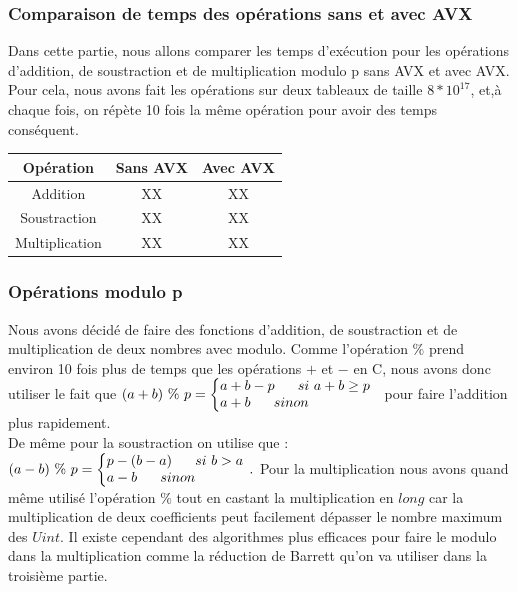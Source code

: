 \documentclass[12pt, a4paper]{article}
\begin{document}
\subsubsection{Comparaison de temps des opérations sans et avec AVX}

Dans cette partie, nous allons comparer les temps d'exécution pour les opérations d'addition, de soustraction et de multiplication modulo p sans AVX et avec AVX. Pour cela, nous avons fait les opérations sur deux tableaux de taille $8*10^{17}$, et,à chaque fois, on répète 10 fois la même opération pour avoir des temps conséquent.

\begin{center}
\begin{tabular}{||c c c||}
\hline
Opération & Sans AVX & Avec AVX \\
\hline\hline
Addition & XX & XX \\
\hline
Soustraction & XX & XX \\
\hline
Multiplication & XX & XX \\
\hline
\end{tabular}
\end{center}

\subsubsection{Opérations modulo p}

Nous avons décidé de faire des fonctions d'addition, de soustraction et de multiplication de deux nombres avec modulo. Comme l'opération $\%$ prend environ 10 fois plus de temps que les opérations $+$ et $-$ en C, nous avons donc utiliser le fait que 
$ (a+b)\ \%\ p = 
\left\{\begin{array}{@{}l@{}}
a + b - p\ \ \ \ \ si\ a+b \geq p\\
a + b\ \ \ \ \ sinon
\end{array}\right.\,\ $ pour faire l'addition plus rapidement. \\
De même pour la soustraction on utilise que :
$ (a-b)\ \%\ p = 
\left\{\begin{array}{@{}l@{}}
p - (b - a)\ \ \ \ \ si\ b > a\\
a - b\ \ \ \ \ sinon
\end{array}\right.\,.$
Pour la multiplication nous avons quand même utilisé l'opération $\%$ tout en castant la multiplication en $long$ car la multiplication de deux coefficients peut facilement dépasser le nombre maximum des $Uint$. Il existe cependant des algorithmes plus efficaces pour faire le modulo dans la multiplication comme la réduction de Barrett qu'on va utiliser dans la troisième partie.
\end{document}
